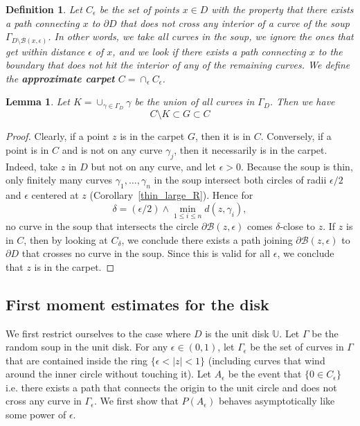 \documentclass[11pt]{article}
\newcommand{\U}{{\mathbb U}}
\newtheorem{Definition}{Definition}
\newtheorem {lemma} [Theorem]    {Lemma}
\newcommand{\eps}{\epsilon}
\newcommand{\geps}{\Gamma_\epsilon}
\newcommand{\PP}{{ P}}
\newcommand{\pa}[1]{\PP (A_{#1})}
\newcommand{\cir}{\partial \B}
\newcommand{\B}{{\mathcal B}}
\begin{document}
\begin{Definition}
Let $C_\eps$ be the set of points $x \in D$ with
the property that there exists a path connecting $x$ to
$\partial D$ that does not cross any interior of a curve of the soup 
$\Gamma_{D \setminus \B(x,\eps)}$.
In other words, we take all curves in the soup, we ignore the ones that
get within distance $\eps$ of $x$, and we look if there exists a path 
connecting $x$ to the
boundary that does not hit the interior of any of the remaining curves.
We define the {\bf approximate carpet} $C = \cap_\eps C_\eps$. 
\end{Definition}


\begin {lemma}
Let $K = \cup_{\gamma \in \Gamma_D} \gamma$ be the union of all
curves in $\Gamma_D$. Then we have
$$ C \setminus K \subset G \subset C $$
\end {lemma}

\begin {proof}
 Clearly, if a point $z$ is in the carpet $G$, then it is in $C$. 
Conversely, if a point is in $C$ and is not on any curve $\gamma_j$, 
then it necessarily is in the carpet.
Indeed, take $z$ in $D$ but not on any curve, and let $\eps>0$.
Because the soup is thin, only finitely many curves 
$\gamma_1, \ldots, \gamma_n$ in the soup intersect both
circles of radii $\eps/2$ and $\eps$ centered at $z$
(Corollary~\ref{thin_large_R}).
Hence for 
$$\delta = (\eps/2) \wedge \min_{1\le i \le n} d(z, \gamma_i),$$
no curve in the soup that intersects the circle $\cir(z,\eps)$
comes $\delta$-close to $z$.
If $z$ is in $C$, then by looking at $C_\delta$, 
we conclude there exists a path joining $\cir(z,\eps)$
to $\partial D$ that crosses no curve
in the soup. Since this is valid for all $\eps$,
we conclude that $z$ is in the carpet.
\end {proof}


\subsection {First moment estimates for the disk}


We first restrict ourselves to the case  where $D$ is the unit disk
$\U$. 
Let $\Gamma$ be the random soup in the unit disk.
For any $\eps \in (0, 1)$, let $\geps$ be the set of curves in $\Gamma$ that
are contained inside the ring $\{ \eps < |z| < 1 \}$
(including curves that wind around the inner circle
without touching it).
Let $A_\eps$ be the event that $\{0 \in C_\eps \}$ i.e. there
exists a path that connects the origin to the unit circle and does not
cross any curve in $\geps$.
We first  show  that $\pa{\eps}$ behaves asymptotically
like some power of $\eps$. 
\end{document}
